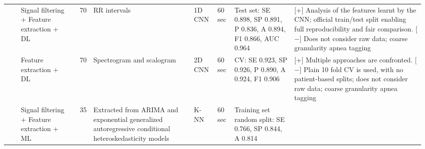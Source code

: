 \documentclass[5p,twocolumn,lefttitle]{elsarticle}
\begin{document}
\begin{table*}[!ht]
{\begin{tabularx}{2\textwidth}{@{}m{2.5em}p{7em}p{10em}lp{2em}p{12em}p{7em}p{3em}p{17em}X@{}}
                            &                                                         & Signal filtering + Feature extraction + DL                     & \cite{shen2021multiscale}                & 70            & RR intervals                                                                                                      & 1D CNN                              & 60 sec                                     & Test set: SE 0.898, SP 0.891, P 0.836, A 0.894, F1 0.866, AUC 0.964                                                                                                                       & [+] Analysis of the features learnt by the CNN; official train/test split enabling full reproducibility and fair comparison. [$-$] Does not consider raw data; coarse granularity apnea tagging                                                                                                                                                                                                                                                           \\
                            
                            \cmidrule(l){3-10} 
                            &                                                         &Feature extraction + DL                     & \cite{10.1371/journal.pone.0250618}                & 70            & Spectrogram and scalogram                                                                                                      & 2D CNN                              & 60 sec                                     & CV: SE 0.923, SP 0.926, P 0.890, A 0.924, F1 0.906
                            
                            & [+]  Multiple approaches are confronted. [$-$] Plain 10 fold CV is used, with no patient-based splits; does not consider raw data; coarse granularity apnea tagging                                                                                                                                                                                                                                                         \\                            \cmidrule(l){3-10} 
                            &                                                         & Signal filtering + Feature extraction + ML                     & \cite{FAAL2021102685}                & 35            & Extracted from ARIMA and exponential generalized autoregressive conditional heteroskedasticity models                                                                                        & K-NN                              & 60 sec                                     & Training set random split: SE 0.766, SP 0.844, A 0.814 
                            

\end{tabularx}}
\end{table*}
\end{document}
